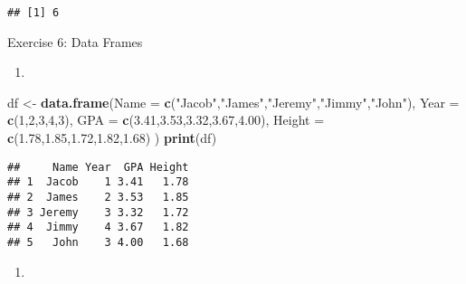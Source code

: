\documentclass[
]{article}
\newenvironment{Shaded}{\begin{snugshade}}{\end{snugshade}}
\newcommand{\AttributeTok}[1]{\textcolor[rgb]{0.13,0.29,0.53}{#1}}
\newcommand{\DecValTok}[1]{\textcolor[rgb]{0.00,0.00,0.81}{#1}}
\newcommand{\FloatTok}[1]{\textcolor[rgb]{0.00,0.00,0.81}{#1}}
\newcommand{\FunctionTok}[1]{\textcolor[rgb]{0.13,0.29,0.53}{\textbf{#1}}}
\newcommand{\NormalTok}[1]{#1}
\newcommand{\OtherTok}[1]{\textcolor[rgb]{0.56,0.35,0.01}{#1}}
\newcommand{\SpecialCharTok}[1]{\textcolor[rgb]{0.81,0.36,0.00}{\textbf{#1}}}
\newcommand{\StringTok}[1]{\textcolor[rgb]{0.31,0.60,0.02}{#1}}
\providecommand{\tightlist}{%
  \setlength{\itemsep}{0pt}\setlength{\parskip}{0pt}}
\begin{document}
\begin{verbatim}
## [1] 6
\end{verbatim}

Exercise 6: Data Frames

\begin{enumerate}
\def\labelenumi{\arabic{enumi})}
\tightlist
\item
\end{enumerate}

\begin{Shaded}
\begin{Highlighting}[]
\NormalTok{df }\OtherTok{\textless{}{-}} \FunctionTok{data.frame}\NormalTok{(}\AttributeTok{Name =} \FunctionTok{c}\NormalTok{(}\StringTok{"Jacob"}\NormalTok{,}\StringTok{"James"}\NormalTok{,}\StringTok{"Jeremy"}\NormalTok{,}\StringTok{"Jimmy"}\NormalTok{,}\StringTok{"John"}\NormalTok{),}
                 \AttributeTok{Year =} \FunctionTok{c}\NormalTok{(}\DecValTok{1}\NormalTok{,}\DecValTok{2}\NormalTok{,}\DecValTok{3}\NormalTok{,}\DecValTok{4}\NormalTok{,}\DecValTok{3}\NormalTok{),}
                 \AttributeTok{GPA =} \FunctionTok{c}\NormalTok{(}\FloatTok{3.41}\NormalTok{,}\FloatTok{3.53}\NormalTok{,}\FloatTok{3.32}\NormalTok{,}\FloatTok{3.67}\NormalTok{,}\FloatTok{4.00}\NormalTok{),}
                 \AttributeTok{Height =} \FunctionTok{c}\NormalTok{(}\FloatTok{1.78}\NormalTok{,}\FloatTok{1.85}\NormalTok{,}\FloatTok{1.72}\NormalTok{,}\FloatTok{1.82}\NormalTok{,}\FloatTok{1.68}\NormalTok{) }
\NormalTok{                 )}
\FunctionTok{print}\NormalTok{(df)}
\end{Highlighting}
\end{Shaded}

\begin{verbatim}
##     Name Year  GPA Height
## 1  Jacob    1 3.41   1.78
## 2  James    2 3.53   1.85
## 3 Jeremy    3 3.32   1.72
## 4  Jimmy    4 3.67   1.82
## 5   John    3 4.00   1.68
\end{verbatim}

\begin{enumerate}
\def\labelenumi{\arabic{enumi})}
\setcounter{enumi}{1}
\tightlist
\item
\end{enumerate}

\begin{Shaded}
\end{Shaded}
\end{document}
